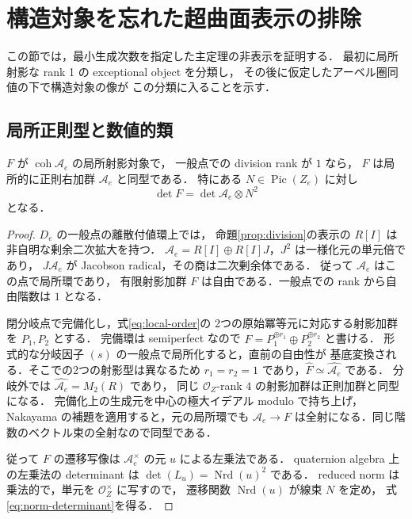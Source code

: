 \section{構造対象を忘れた超曲面表示の排除}
\label{sec:unpointed}

この節では，最小生成次数を指定した主定理の非表示を証明する．
最初に局所射影な rank 1 の exceptional object を分類し，
その後に仮定したアーベル圏同値の下で構造対象の像が
この分類に入ることを示す．

\subsection{局所正則型と数値的類}

\begin{lemma}
\label{lem:regular-type}
$F$ が $\operatorname{coh}\mathcal A_e$ の局所射影対象で，
一般点での division rank が $1$ なら，
$F$ は局所的に正則右加群 $\mathcal A_e$ と同型である．
特にある $N\in\operatorname{Pic}(Z_e)$ に対し
\begin{equation}
 \det F=\det\mathcal A_e\otimes N^2
 \label{eq:norm-determinant}
\end{equation}
となる．
\end{lemma}
\begin{proof}
$D_e$ の一般点の離散付値環上では，
命題\ref{prop:division}の表示の $R[I]$ は非自明な剰余二次拡大を持つ．
$\mathcal A_e=R[I]\oplus R[I]J$，$J^2$ は一様化元の単元倍であり，
$J\mathcal A_e$ が Jacobson radical，その商は二次剰余体である．
従って $\mathcal A_e$ はこの点で局所環であり，
有限射影加群 $F$ は自由である．一般点での rank から自由階数は $1$ となる．

閉分岐点で完備化し，式\eqref{eq:local-order}の
2つの原始冪等元に対応する射影加群を $P_1,P_2$ とする．
完備環は semiperfect なので
$\widehat F=P_1^{\oplus r_1}\oplus P_2^{\oplus r_2}$ と書ける．
形式的な分岐因子 $(s)$ の一般点で局所化すると，直前の自由性が
基底変換される．そこでの2つの射影型は異なるため
$r_1=r_2=1$ であり，$\widehat F\simeq\widehat{\mathcal A_e}$ である．
分岐外では $\widehat{\mathcal A_e}=M_2(R)$ であり，
同じ $\mathcal O_Z$-rank $4$ の射影加群は正則加群と同型になる．
完備化上の生成元を中心の極大イデアル modulo で持ち上げ，
Nakayama の補題を適用すると，元の局所環でも
$\mathcal A_e\to F$ は全射になる．同じ階数のベクトル束の全射なので同型である．

従って $F$ の遷移写像は $\mathcal A_e^\times$ の元 $u$ による左乗法である．
quaternion algebra 上の左乗法の determinant は
$\det(L_u)=\operatorname{Nrd}(u)^2$ である．
reduced norm は乗法的で，単元を $\mathcal O_Z^\times$ に写すので，
遷移関数 $\operatorname{Nrd}(u)$ が線束 $N$ を定め，
式\eqref{eq:norm-determinant}を得る．
\end{proof}

